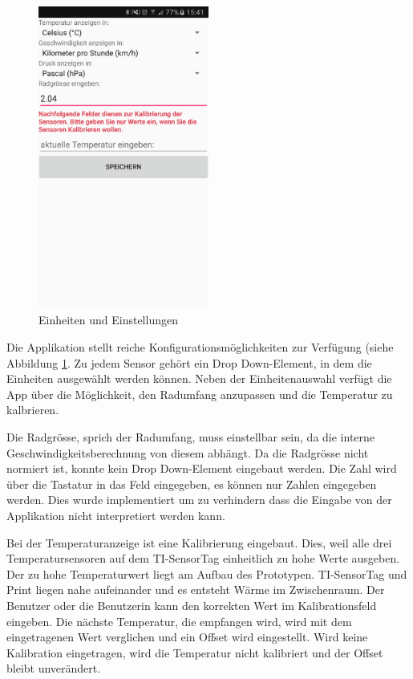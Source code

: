 \begin{figure}[ht]
    \includegraphics[width=0.5\textwidth]{4Resultate/imag/BLEEinheitenUndEinstellungenStart.png} 
    \caption{Einheiten und Einstellungen}
    \label{einheiten}
\end{figure}

Die Applikation stellt reiche Konfigurationsmöglichkeiten zur Verfügung (siehe Abbildung \ref{einheiten}. Zu jedem Sensor gehört ein Drop Down-Element, in dem die Einheiten ausgewählt werden können. Neben der Einheitenauswahl verfügt die App über die Möglichkeit, den Radumfang anzupassen und die Temperatur zu kalbrieren. 

Die Radgrösse, sprich der Radumfang, muss einstellbar sein, da die interne Geschwindigkeitsberechnung von diesem abhängt. Da die Radgrösse nicht normiert ist, konnte kein Drop Down-Element eingebaut werden. Die Zahl wird über die Tastatur in das Feld eingegeben, es können nur Zahlen eingegeben werden. Dies wurde implementiert um zu verhindern dass die Eingabe von der Applikation nicht interpretiert werden kann.

Bei der Temperaturanzeige ist eine Kalibrierung eingebaut. Dies, weil alle drei Temperatursensoren auf dem TI-SensorTag einheitlich zu hohe Werte ausgeben. Der zu hohe Temperaturwert liegt am Aufbau des Prototypen. TI-SensorTag und Print liegen nahe aufeinander und es entsteht Wärme im Zwischenraum. Der Benutzer oder die Benutzerin kann den korrekten Wert im Kalibrationsfeld eingeben. Die nächste Temperatur, die empfangen wird, wird mit dem eingetragenen Wert verglichen und ein Offset wird eingestellt. Wird keine Kalibration eingetragen, wird die Temperatur nicht kalibriert und der Offset bleibt unverändert.

